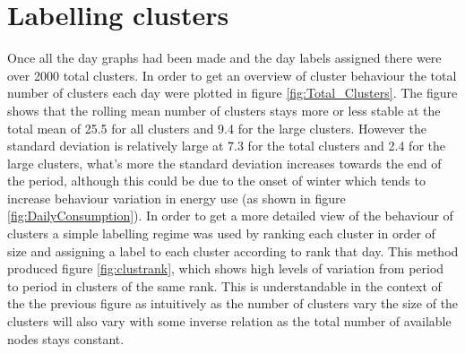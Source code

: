 \section{Labelling clusters}
\label{sec:labelling}
Once all the day graphs had been made and the day labels assigned there were over 2000 total clusters. In order to get an overview of cluster behaviour the total number of clusters each day were plotted in figure \ref{fig:Total_Clusters}. The figure shows that the rolling mean number of clusters stays more or less stable at the total mean of 25.5 for all clusters and 9.4 for the large clusters. However the standard deviation is relatively large at 7.3 for the total clusters and 2.4 for the large clusters, what's more the standard deviation increases towards the end of the period, although this could be due to the onset of winter which tends to increase behaviour variation in energy use (as shown in figure \ref{fig:DailyConsumption}). In order to get a more detailed view of the behaviour of clusters a simple labelling regime was used by ranking each cluster in order of size and assigning a label to each cluster according to rank that day. This method produced figure \ref{fig:clustrank}, which shows high levels of variation from period to period in clusters of the same rank. This is understandable in the context of the the previous figure as intuitively as the number of clusters vary the size of the clusters will also vary with some inverse relation as the total number of available nodes stays constant.

